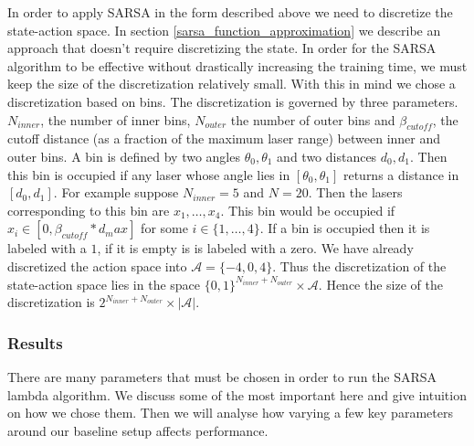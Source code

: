 \documentclass{article}
\begin{document}
In order to apply SARSA in the form described above we need to discretize the state-action space. In section \ref{sarsa_function_approximation} we describe an approach that doesn't require discretizing the state. In order for the SARSA algorithm to be effective without drastically increasing the training time, we must keep the size of the discretization relatively small. With this in mind we chose a discretization based on bins. The discretization is governed by three parameters. $N_{inner}$, the number of inner bins, $N_{outer}$ the number of outer bins and $\beta_{cutoff}$, the cutoff distance (as a fraction of the maximum laser range) between inner and outer bins. A bin is defined by two angles $\theta_0, \theta_1$ and two distances $d_0, d_1$. Then this bin is occupied if any laser whose angle lies in $[\theta_0,\theta_1]$ returns a distance in $[d_0,d_1]$. For example suppose $N_{inner} = 5$ and $N = 20$. Then the lasers corresponding to this bin are $x_1,\ldots,x_4$. This bin would be occupied if $x_i \in [0, \beta_{cutoff}*d_max]$ for some $i \in \{1,\ldots,4\}$. If a bin is occupied then it is labeled with a $1$, if it is empty is is labeled with a zero. We have already discretized the action space into $\mathcal{A} = \{-4,0,4\}$. Thus the discretization of the state-action space lies in the space $\{0,1\}^{N_{inner} + N_{outer}} \times \mathcal{A}$. Hence the size of the discretization is $2^{N_{inner} + N_{outer}} \times |\mathcal{A}|$.




\subsubsection{Results}

There are many parameters that must be chosen in order to run the SARSA lambda algorithm. We discuss some of the most important here and give intuition on how we chose them. Then we will analyse how varying a few key parameters around our baseline setup affects performance. 
\end{document}
